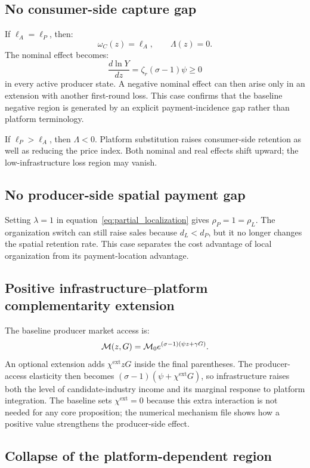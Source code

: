 \subsection{No consumer-side capture gap}

If \(\ell_A=\ell_P\), then:
\[
\omega_C(z)=\ell_A,
\qquad
\Lambda(z)=0.
\]
The nominal effect becomes:
\[
\frac{d\ln Y}{dz}
=
\zeta_r(\sigma-1)\psi\geq0
\]
in every active producer state.  A negative nominal effect can then arise
only in an extension with another first-round loss.  This case confirms that
the baseline negative region is generated by an explicit payment-incidence
gap rather than platform terminology.

If \(\ell_P>\ell_A\), then \(\Lambda<0\).  Platform substitution raises
consumer-side retention as well as reducing the price index.  Both nominal
and real effects shift upward; the low-infrastructure loss region may vanish.

\subsection{No producer-side spatial payment gap}

Setting \(\lambda=1\) in equation~\eqref{eq:partial_localization} gives
\(\rho_P=1=\rho_L\).  The organization switch can still raise sales because
\(d_L<d_P\), but it no longer changes the spatial retention rate.  This case
separates the cost advantage of local organization from its payment-location
advantage.

\subsection{Positive infrastructure--platform complementarity extension}

The baseline producer market access is:
\[
\mathcal M(z,G)
=
\mathcal M_0e^{(\sigma-1)(\psi z+\gamma G)}.
\]
An optional extension adds
\(\chi^{\mathrm{ext}}zG\) inside the final parentheses.  The producer-access
elasticity then becomes
\((\sigma-1)(\psi+\chi^{\mathrm{ext}}G)\), so infrastructure raises both the
level of candidate-industry income and its marginal response to platform
integration.  The baseline sets \(\chi^{\mathrm{ext}}=0\) because this extra
interaction is not needed for any core proposition; the numerical mechanism
file shows how a positive value strengthens the producer-side effect.

\subsection{Collapse of the platform-dependent region}

